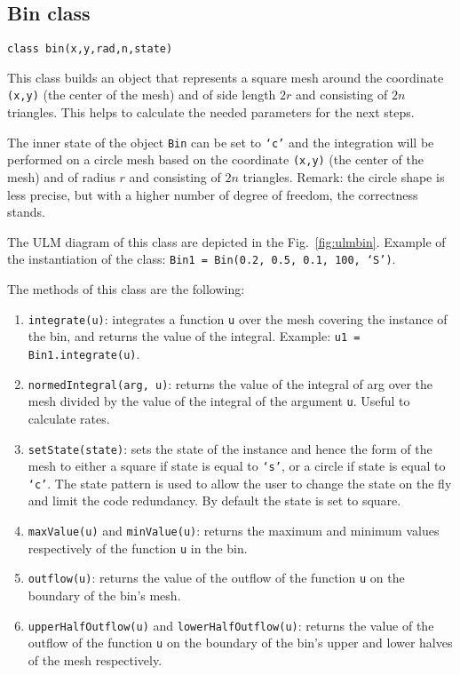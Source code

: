 \documentclass[11pt,oneside]{article}   	%
\renewcommand{\figurename}{Fig.}
\newcommand{\figref}[1]{\figurename~\ref{#1}}
\begin{document}
\subsection{Bin class}
\texttt{class bin(x,y,rad,n,state)}

This class builds an object that represents a square mesh around the coordinate \texttt{(x,y)} (the center of the mesh) and of side length $2r$ and consisting of $2n$ triangles.
This helps to calculate the needed parameters for the next steps. 


The inner state of the object \texttt{Bin} can be set to \texttt{`c'} and the integration will be performed on a circle mesh based on the coordinate \texttt{(x,y)} (the center of the mesh) and of radius $r$ and consisting of $2n$ triangles. Remark: the circle shape is less precise, but with a higher number of degree of freedom, the correctness stands.

The ULM diagram of this class are depicted in the \figref{fig:ulmbin}.
Example of the instantiation of the class: \texttt{Bin1 = Bin(0.2, 0.5, 0.1, 100, `S')}.


The methods of this class are the following:
\begin{enumerate}
\item{\texttt{integrate(u)}}: integrates a function \texttt{u} over the mesh covering the instance of the bin, and returns the value of the integral.
Example: \texttt{u1 = Bin1.integrate(u)}.
\item{\texttt{normedIntegral(arg, u)}}: returns the value of the integral of arg over the mesh divided by the value of the integral of the argument \texttt{u}.
Useful to calculate rates.
\item{\texttt{setState(state)}}: sets the state of the instance and hence the form of the mesh to either a square if state is equal to \texttt{`s'}, or a circle if state is equal to \texttt{`c'}.
The state pattern is used to allow the user to change the state on the fly and limit the code redundancy.
By default the state is set to square.
\item{\texttt{maxValue(u)} and \texttt{minValue(u)}}: returns the maximum and minimum values respectively of the function \texttt{u} in the bin.
\item{\texttt{outflow(u)}}: returns the value of the outflow of the function \texttt{u} on the boundary of the bin's mesh.
\item{\texttt{upperHalfOutflow(u)} and \texttt{lowerHalfOutflow(u)}}: returns the value of the outflow of the function \texttt{u} on the boundary of the bin's upper and lower halves of the mesh respectively.
\end{enumerate}
\end{document}
